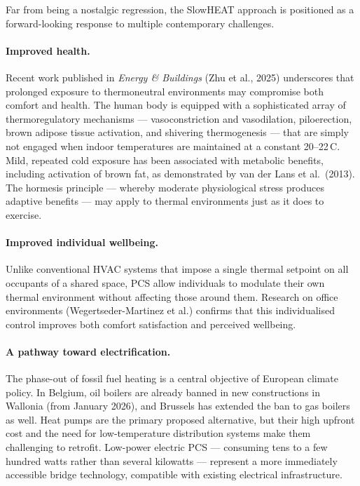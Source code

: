Far from being a nostalgic regression, the SlowHEAT approach is
positioned as a forward-looking response to multiple contemporary
challenges.

\paragraph{Improved health.}
Recent work published in \textit{Energy \& Buildings} (Zhu et al.,
2025) underscores that prolonged exposure to thermoneutral
environments may compromise both comfort and health. The human
body is equipped with a sophisticated array of thermoregulatory
mechanisms --- vasoconstriction and vasodilation, piloerection,
brown adipose tissue activation, and shivering thermogenesis ---
that are simply not engaged when indoor temperatures are
maintained at a constant 20--22\,\textdegree C. Mild, repeated
cold exposure has been associated with metabolic benefits,
including activation of brown fat, as demonstrated by van der
Lans et al.\ (2013). The hormesis principle --- whereby moderate
physiological stress produces adaptive benefits --- may apply to
thermal environments just as it does to exercise.

\paragraph{Improved individual wellbeing.}
Unlike conventional HVAC systems that impose a single thermal
setpoint on all occupants of a shared space, PCS allow individuals
to modulate their own thermal environment without affecting those
around them. Research on office environments (Wegertseder-Martinez
et al.) confirms that this individualised control improves both
comfort satisfaction and perceived wellbeing.

\paragraph{A pathway toward electrification.}
The phase-out of fossil fuel heating is a central objective of
European climate policy. In Belgium, oil boilers are already
banned in new constructions in Wallonia (from January 2026), and
Brussels has extended the ban to gas boilers as well. Heat pumps
are the primary proposed alternative, but their high upfront cost
and the need for low-temperature distribution systems make them
challenging to retrofit. Low-power electric PCS --- consuming
tens to a few hundred watts rather than several kilowatts ---
represent a more immediately accessible bridge technology,
compatible with existing electrical infrastructure.

